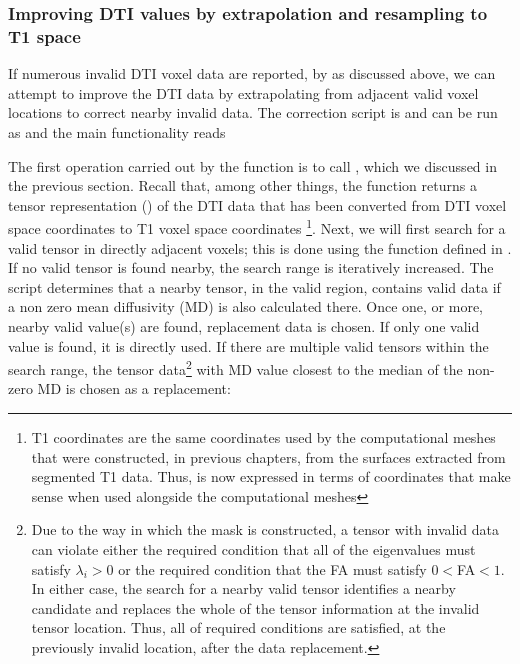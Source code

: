 \subsubsection*{Improving DTI values by extrapolation and resampling to T1 space}
If numerous invalid DTI voxel data are reported, by  as 
discussed above, we can attempt to improve the DTI data by extrapolating from 
adjacent valid voxel locations to correct nearby invalid data.  The 
correction script is  and can be run as
\terminal{\$ cd mri2fem/chp5\\
\$ python3 clean\_dti\_data.py -{}-dti tensor.nii.gz -{}-mask mask.mgz -{}-out tensor-clean.nii}
\noindent and the main functionality reads 

The first operation carried out by the  function 
is to call , which we discussed in the previous 
section.  Recall that, among other things, the  
function returns a tensor representation () of the DTI data that has been 
converted from DTI voxel space coordinates to T1 voxel space coordinates%
\footnote{T1 coordinates are the same coordinates used by the computational 
meshes that were constructed, in previous chapters, from the surfaces extracted 
from {\freesurfer} segmented T1 data.  Thus,  is now expressed in terms 
of coordinates that make sense when used alongside the computational meshes}.
Next, we will first search for a valid tensor in directly adjacent voxels;
this is done using the function  
defined in . If no valid tensor is found nearby, the 
search range is iteratively increased.  %
%
The script determines that a nearby tensor, in the valid region, contains valid 
data if a non zero mean diffusivity (MD) is also calculated there.  Once one, 
or more, nearby valid value(s) are found, replacement data is chosen.  If only 
one valid value is found, it is directly used.  If there are multiple valid 
tensors within the search range, the tensor data\footnote{Due to the way in 
which the  mask is constructed, a tensor with invalid data can 
violate either the required condition that all of the eigenvalues must 
satisfy $\lambda_i > 0$ or the required condition that the FA must 
satisfy $0<$FA$<1$.  In either case, the search for a nearby valid tensor 
identifies a nearby candidate and replaces the whole of the tensor information 
at the invalid tensor location.  Thus, all of required conditions are satisfied, 
at the previously invalid location, after the data replacement.} with MD value 
closest to the median of the non-zero MD is chosen as a replacement: 

